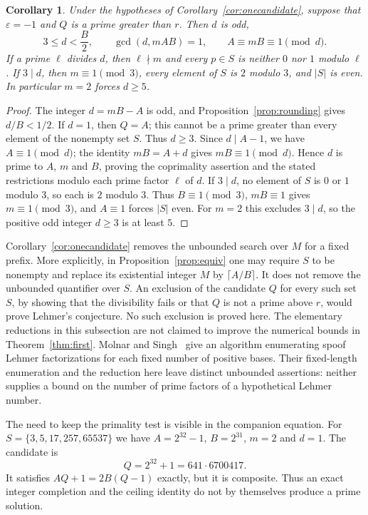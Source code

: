 \documentclass[screen,reqno]{aomart}
\numberwithin{equation}{section}
\theoremstyle{plain}
\newtheorem{corollary}[theorem]{Corollary}
\theoremstyle{definition}
\theoremstyle{remark}
\begin{document}
\begin{corollary}\label{cor:defectconstraints}
Under the hypotheses of Corollary~\ref{cor:onecandidate}, suppose
that $\varepsilon=-1$ and $Q$ is a prime greater than $r$.
Then $d$ is odd,
\[
 3\le d<\frac B2,\qquad \gcd(d,mAB)=1,
 \qquad A\equiv mB\equiv1\pmod d.
\]
If a prime $\ell$ divides $d$, then $\ell\nmid m$ and every
$p\in S$ is neither $0$ nor $1$ modulo $\ell$.
If $3\mid d$, then $m\equiv1\pmod3$, every element of $S$ is
$2$ modulo $3$, and $|S|$ is even. In particular $m=2$ forces
$d\ge5$.
\end{corollary}

\begin{proof}
The integer $d=mB-A$ is odd, and Proposition~\ref{prop:rounding}
gives $d/B<1/2$. If $d=1$, then $Q=A$; this cannot be a prime
greater than every element of the nonempty set $S$. Thus $d\ge3$.
Since $d\mid A-1$, we have $A\equiv1\pmod d$; the identity
$mB=A+d$ gives $mB\equiv1\pmod d$. Hence $d$ is prime to
$A$, $m$ and $B$, proving the coprimality assertion and the stated
restrictions modulo each prime factor $\ell$ of $d$.
If $3\mid d$, no element of $S$ is $0$ or $1$ modulo $3$, so each
is $2$ modulo $3$. Thus $B\equiv1\pmod3$, $mB\equiv1$ gives
$m\equiv1\pmod3$, and $A\equiv1$ forces $|S|$ even.
For $m=2$ this excludes $3\mid d$, so the positive odd integer
$d\ge3$ is at least $5$.
\end{proof}

Corollary~\ref{cor:onecandidate} removes the unbounded search over
$M$ for a fixed prefix. More explicitly, in
Proposition~\ref{prop:equiv} one may require $S$ to be nonempty and
replace its existential integer $M$ by $\lceil A/B\rceil$.
It does not remove the unbounded quantifier over $S$.
An exclusion of the candidate $Q$ for every such set $S$, by showing
that the divisibility fails or that $Q$ is not a prime above $r$,
would prove Lehmer's conjecture. No such exclusion is proved here.
The elementary reductions in this subsection are not claimed to
improve the numerical bounds in Theorem~\ref{thm:first}.
Molnar and Singh~\cite{MS26} give an algorithm enumerating spoof
Lehmer factorizations for each fixed number of positive bases.
Their fixed-length enumeration and the reduction here leave distinct
unbounded assertions: neither supplies a bound on the number of
prime factors of a hypothetical Lehmer number.

The need to keep the primality test is visible in the companion
equation. For $S=\{3,5,17,257,65537\}$ we have
$A=2^{32}-1$, $B=2^{31}$, $m=2$ and $d=1$. The candidate is
\[
 Q=2^{32}+1=641\cdot6700417.
\]
It satisfies $AQ+1=2B(Q-1)$ exactly, but it is composite.
Thus an exact integer completion and the ceiling identity do not
by themselves produce a prime solution.
\end{document}
